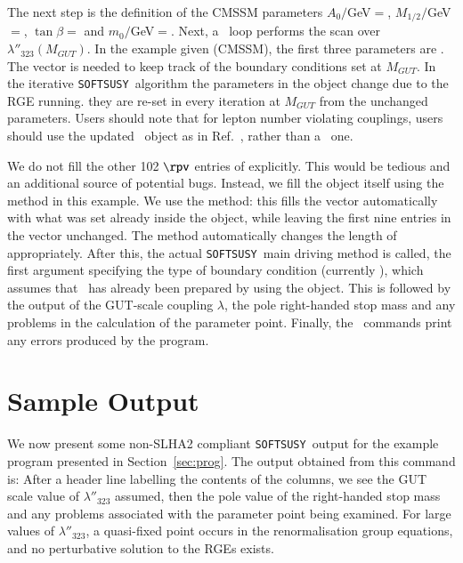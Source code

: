 \documentclass[final,3p,times,pdflatex]{elsarticle}
\def\SOFTSUSY{{\tt SOFTSUSY}}
\begin{document}
The next step is the definition of the CMSSM parameters $A_0/$GeV$=$,
$M_{1/2}/$GeV$=$, $\tan \beta=$ and
$m_0/$GeV$=$. Next, a ~loop performs the scan over
$\lambda''_{323}(M_{GUT})$. 
In the example given (CMSSM), the first three parameters are
. The  vector is
needed to keep track 
of the boundary conditions set at $M_{GUT}$.
In the iterative \SOFTSUSY~algorithm
the parameters in the  
object change due to
the RGE running\@.
they are re-set in
every iteration at $M_{GUT}$ from the unchanged ~
parameters. Users should note that for lepton number violating couplings,
users should use the updated ~object as in
Ref.~\cite{rpvneut}, rather than a 
~one.

We do not fill the other 102 $\rpv$ entries
of  explicitly. This would be tedious and an additional
source of potential bugs. Instead, we fill the  object
itself using the  method in this example.  
We use the  method: this fills the
 vector automatically with what was set already inside the
 object, while leaving the first nine entries in the
vector unchanged. The  method automatically changes the length
of  appropriately. 
After this, the actual \SOFTSUSY~main driving method  is
called, the first argument specifying the type of boundary condition 
(currently ), which assumes that ~has already
been prepared by using the  object. 
This is followed by the output of the GUT-scale coupling $\lambda$, 
the pole right-handed stop mass and any problems in the calculation of the
parameter point.  Finally, the ~commands print any errors produced
by the program.


\section{Sample Output \label{sec:output}}

We now present some non-SLHA2 compliant \SOFTSUSY~output
for the example program presented in Section~\ref{sec:prog}.
\normalsize
The output obtained from this command is:
\small\normalsize
After a header line labelling the contents of the columns, we see the GUT
scale value of $\lambda''_{323}$ assumed, then the pole value of the
right-handed stop mass and any problems associated with the parameter point
being examined. For large values of $\lambda''_{323}$, a quasi-fixed point
occurs in the renormalisation group equations, and no perturbative solution to
the RGEs exists. 
\end{document}
